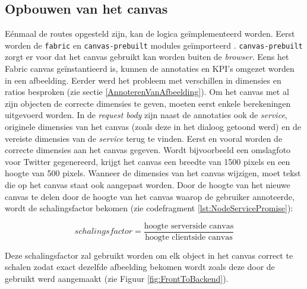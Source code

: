 \subsection{Opbouwen van het canvas} \label{OpbouwenCanvas}
E\'{e}nmaal de routes opgesteld zijn, kan de logica ge\"{i}mplementeerd worden. Eerst worden de \texttt{fabric} en \texttt{canvas-prebuilt} modules ge\"{i}mporteerd \cite{CanvasPrebuilt}. \texttt{canvas-prebuilt} zorgt er voor dat het canvas gebruikt kan worden buiten de \textit{browser}. Eens het Fabric canvas ge\"{i}nstantieerd is, kunnen de annotaties en KPI's omgezet worden in een afbeelding. Eerder werd het probleem met verschillen in dimensies en ratios besproken (zie sectie \ref{AnnoterenVanAfbeelding}). Om het canvas met al zijn objecten de correcte dimensies te geven, moeten eerst enkele berekeningen uitgevoerd worden. In de \textit{request body} zijn naast de annotaties ook de \textit{service}, originele dimensies van het canvas (zoals deze in het dialoog getoond werd) en de vereiste dimensies van de \textit{service} terug te vinden. Eerst en vooral worden de correcte dimensies aan het canvas gegeven. Wordt bijvoorbeeld een omslagfoto voor Twitter gegenereerd, krijgt het canvas een breedte van 1500 pixels en een hoogte van 500 pixels. Wanneer de dimensies van het canvas wijzigen, moet tekst die op het canvas staat ook aangepast worden. Door de hoogte van het nieuwe canvas te delen door de hoogte van het canvas waarop de gebruiker annoteerde, wordt de schalingsfactor bekomen (zie codefragment \ref{lst:NodeServicePromise}):  

\[ schalingsfactor = \frac{\text{hoogte serverside canvas}}{\text{hoogte clientside canvas}} \]

Deze schalingsfactor zal gebruikt worden om elk object in het canvas correct te schalen zodat exact dezelfde afbeelding bekomen wordt zoals deze door de gebruikt werd aangemaakt (zie Figuur \ref{fig:FrontToBackend}).


